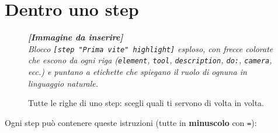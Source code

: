 ﻿\documentclass[a4paper,12pt,oneside]{book}
\newcommand{\imgph}[2]{%
  \begin{tcolorbox}[colback=cvtlightblue!30,colframe=cvtblue!40,%
    width=#1,halign=center,valign=center,height=5cm,boxrule=0.5pt,arc=3pt]%
    \textcolor{cvtgray}{\itshape\footnotesize\textbf{[Immagine da inserire]}\\[3pt]#2}%
  \end{tcolorbox}}
\begin{document}
\chapter{Dentro uno step}
\label{ch:righe-magiche}

\begin{figure}[H]
  \centering
  \imgph{13cm}{Blocco \texttt{[step "Prima vite" highlight]} esploso, con frecce colorate che escono da ogni riga (\texttt{element}, \texttt{tool}, \texttt{description}, \texttt{do:}, \texttt{camera}, ecc.) e puntano a etichette che spiegano il ruolo di ognuna in linguaggio naturale.}
  \caption{Tutte le righe di uno step: scegli quali ti servono di volta in volta.}
  \label{fig:anatomia-step}
\end{figure}

Ogni step può contenere queste istruzioni (tutte in \textbf{minuscolo} con \texttt{=}):
\end{document}
